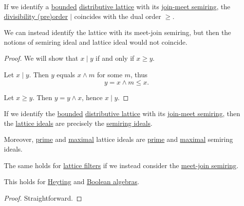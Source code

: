 \begin{proposition}\label{thm:lattice_divisibility}
  If we identify a \hyperref[def:extremal_points/bounds]{bounded} \hyperref[def:distributive_lattice]{distributive lattice} with its \hyperref[def:lattice_as_semiring]{join-meet semiring}, the \hyperref[thm:semiring_divisibility_order]{divisibility (pre)order} \( \mid \) coincides with the dual order \( \geq \).
\end{proposition}
\begin{comments}
  \item We can instead identify the lattice with its meet-join semiring, but then the notions of semiring ideal and lattice ideal would not coincide.
\end{comments}
\begin{proof}
  We will show that \( x \mid y \) if and only if \( x \geq y \).

  \SufficiencySubProof Let \( x \mid y \). Then \( y \) equals \( x \wedge m \) for some \( m \), thus
  \begin{equation*}
    y = x \wedge m \leq x.
  \end{equation*}

  \NecessitySubProof Let \( x \geq y \). Then \( y = y \wedge x \), hence \( x \mid y \).
\end{proof}

\begin{proposition}\label{thm:lattice_ideal_as_semiring_ideal}
  If we identify the \hyperref[def:extremal_points/bounds]{bounded} \hyperref[def:distributive_lattice]{distributive lattice} with its \hyperref[def:lattice_as_semiring]{join-meet semiring}, then the \hyperref[def:lattice_ideal]{lattice ideals} are precisely the \hyperref[def:semiring_ideal]{semiring ideals}.

  Moreover, \hyperref[def:lattice_ideal/prime]{prime} and \hyperref[def:lattice_ideal/maximal]{maximal} lattice ideals are \hyperref[def:semiring_ideal/prime]{prime} and \hyperref[def:semiring_ideal/maximal]{maximal} semiring ideals.
\end{proposition}
\begin{comments}
  \item The same holds for \hyperref[def:lattice_ideal]{lattice filters} if we instead consider the \hyperref[def:lattice_as_semiring]{meet-join semiring}.

  \item This holds for \hyperref[def:heyting_algebra]{Heyting} and \hyperref[def:boolean_algebra]{Boolean algebras}.
\end{comments}
\begin{proof}
  Straightforward.
\end{proof}

